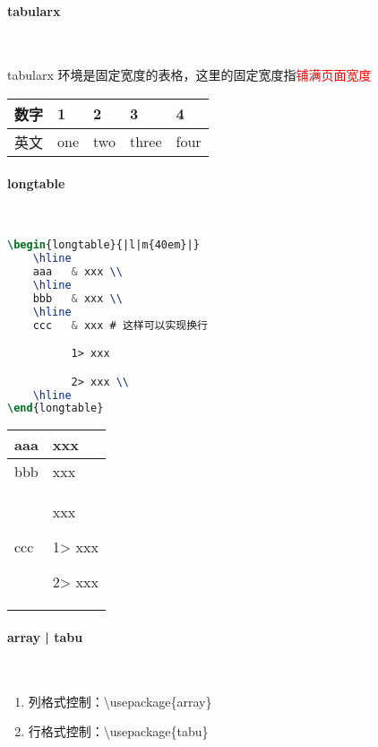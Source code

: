 \paragraph{tabularx}~{}

tabularx 环境是固定宽度的表格，这里的固定宽度指\textcolor{red}{铺满页面宽度}

%
%
\begin{tabularx}{46em}{|c|X|X|R|C|}
    \hline
    数字 & 1 & 2 & 3 & 4 \\
    \hline
    英文 & one & two & three & four \\
    \hline
\end{tabularx}

\paragraph{longtable}~{}

\begin{lstlisting}[language={tex}]
\begin{longtable}{|l|m{40em}|}
    \hline
    aaa   & xxx \\
    \hline
    bbb   & xxx \\
    \hline
    ccc   & xxx # 这样可以实现换行

          1> xxx

          2> xxx \\
    \hline
\end{longtable}
\end{lstlisting}

\begin{longtable}{|l|m{40em}|}
    \hline
    aaa   & xxx \\
    \hline
    bbb   & xxx \\
    \hline
    ccc   & xxx

          1> xxx

          2> xxx \\
    \hline
\end{longtable}

\paragraph{array | tabu}~{}

\begin{enumerate}[topsep=0pt,itemsep=0pt,parsep=0pt,leftmargin=3.6em,label=\arabic*>]
    \item 列格式控制：\textbackslash usepackage\{array\}
    \item 行格式控制：\textbackslash usepackage\{tabu\}
\end{enumerate}

